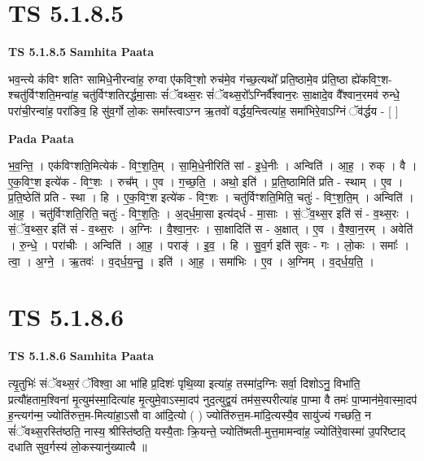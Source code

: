 \documentclass[17pt]{extarticle}
\begin{document}
\section*{ TS 5.1.8.5 }

\textbf{TS 5.1.8.5 } \newline
\textbf{Samhita Paata} \newline

भव॒न्त्ये क॑विꣳ शतिꣳ सामिधे॒नीरन्वा॑ह॒ रुग्वा ए॑कविꣳ॒॒शो रुच॑मे॒व ग॑च्छ॒त्यथो᳚ प्रति॒ष्ठामे॒व प्र॑ति॒ष्ठा ह्ये॑कविꣳ॒॒श-श्चतु॑र्विꣳशति॒मन्वा॑ह॒ चतु॑र्विꣳशतिरर्द्धमा॒साः सं॑ॅवथ्स॒रः सं॑ॅवथ्स॒रो᳚ऽग्निर्वै᳚श्वान॒रः सा॒क्षादे॒व वै᳚श्वान॒रमव॑ रुन्धे॒ परा॑ची॒रन्वा॑ह॒ परा॑ङिव॒ हि सु॑व॒र्गो लो॒कः समा᳚स्त्वाऽग्न ऋ॒तवो॑ वर्द्धय॒न्त्वित्या॑ह॒ समा॑भिरे॒वाऽग्निं ॅव॑र्द्धय - [  ] \newline

\textbf{Pada Paata} \newline

भ॒व॒न्ति॒ । एक॑विꣳशति॒मित्येक॑ - विꣳ॒॒श॒ति॒म् । सा॒मि॒धे॒नीरिति॑ सां - इ॒धे॒नीः । अन्विति॑ । आ॒ह॒ । रुक् । वै । ए॒क॒विꣳ॒॒श इत्ये॑क - विꣳ॒॒शः । रुच᳚म् । ए॒व । ग॒च्छ॒ति॒ । अथो॒ इति॑ । प्र॒ति॒ष्ठामिति॑ प्रति - स्थाम् । ए॒व । प्र॒ति॒ष्ठेति॑ प्रति - स्था । हि । ए॒क॒विꣳ॒॒श इत्ये॑क - विꣳ॒॒शः । चतु॑र्विꣳशति॒मिति॒ चतुः॑ - विꣳ॒॒श॒ति॒म् । अन्विति॑ । आ॒ह॒ । चतु॑र्विꣳशति॒रिति॒ चतुः॑ - विꣳ॒॒श॒तिः॒ । अ॒द्‌र्ध॒मा॒सा इत्य॑द्‌र्ध - मा॒साः । सं॒ॅव॒थ्स॒र इति॑ सं - व॒थ्स॒रः । सं॒ॅव॒थ्स॒र इति॑ सं - व॒थ्स॒रः । अ॒ग्निः । वै॒श्वा॒न॒रः । सा॒क्षादिति॑ स - अ॒क्षात् । ए॒व । वै॒श्वा॒न॒रम् । अवेति॑ । रु॒न्धे॒ । परा॑चीः । अन्विति॑ । आ॒ह॒ । पराङ्॑ । इ॒व॒ । हि । सु॒व॒र्ग इति॑ सुवः - गः । लो॒कः । समाः᳚ । त्वा॒ । अ॒ग्ने॒ । ऋ॒तवः॑ । व॒द्‌र्ध॒य॒न्तु॒ । इति॑ । आ॒ह॒ । समा॑भिः । ए॒व । अ॒ग्निम् । व॒द्‌र्ध॒य॒ति॒ ।  \newline




\section*{ TS 5.1.8.6 }

\textbf{TS 5.1.8.6 } \newline
\textbf{Samhita Paata} \newline

त्यृ॒तुभिः॑ संॅवथ्स॒रं ॅविश्वा॒ आ भा॑हि प्र॒दिशः॑ पृथि॒व्या इत्या॑ह॒ तस्मा॑द॒ग्निः सर्वा॒ दिशोऽनु॒ विभा॑ति॒ प्रत्यौ॑हताम॒श्विना॑ मृ॒त्युम॑स्मा॒दित्या॑ह मृ॒त्युमे॒वाऽस्मा॒दप॑ नुद॒त्युद्व॒यं तम॑स॒स्परीत्या॑ह पा॒प्मा वै तमः॑ पा॒प्मान॑मे॒वास्मा॒दप॑ ह॒न्त्यग॑न्म॒ ज्योति॑रुत्त॒म-मित्या॑हा॒ऽसौ वा आ॑दि॒त्यो ( ) ज्योति॑रुत्त॒म-मा॑दि॒त्यस्यै॒व सायु॑ज्यं गच्छति॒ न सं॑ॅवथ्स॒रस्ति॑ष्ठति॒ नास्य॒ श्रीस्ति॑ष्ठति॒ यस्यै॒ताः क्रि॒यन्ते॒ ज्योति॑ष्मती-मुत्त॒मामन्वा॑ह॒ ज्योति॑रे॒वास्मा॑ उ॒परि॑ष्टाद् दधाति सुव॒र्गस्य॑ लो॒कस्यानु॑ख्यात्यै ॥ \newline
\end{document}
